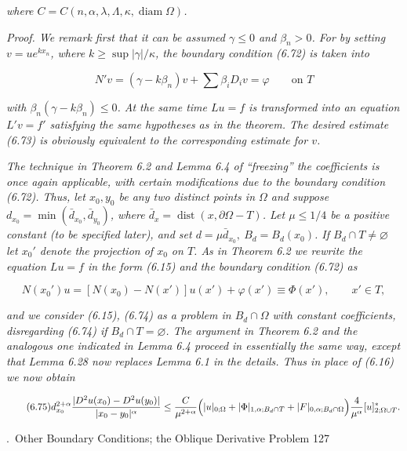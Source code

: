 \emph{where $C=C(n,\alpha,\lambda,\Lambda,\kappa,\operatorname{diam}\Omega)$.}

\emph{Proof. We remark first that it can be assumed $\gamma\le 0$ and $\beta_n>0$. For by setting
$v=ue^{kx_n}$, where $k\ge \sup|\gamma|/\kappa$, the boundary condition (6.72) is taken into}

\[
N'v=(\gamma-k\beta_n)v+\sum \beta_i D_i v=\varphi \qquad \text{on } T
\]

\emph{with $\beta_n(\gamma-k\beta_n)\le 0$. At the same time $Lu=f$ is transformed into an equation
$L'v=f'$ satisfying the same hypotheses as in the theorem. The desired estimate (6.73)
is obviously equivalent to the corresponding estimate for $v$.}

\emph{The technique in Theorem 6.2 and Lemma 6.4 of ``freezing'' the coefficients is
once again applicable, with certain modifications due to the boundary condition
(6.72). Thus, let $x_0, y_0$ be any two distinct points in $\Omega$ and suppose $d_{x_0}=\min(\bar d_{x_0}, \bar d_{y_0})$,
where $\bar d_x=\operatorname{dist}(x,\partial\Omega-T)$. Let $\mu\le 1/4$ be a positive constant (to be specified
later), and set $d=\mu \bar d_{x_0},\ B_d=B_d(x_0)$. If $B_d\cap T\ne \varnothing$ let $x_0'$ denote the projection of
$x_0$ on $T$. As in Theorem 6.2 we rewrite the equation $Lu=f$ in the form (6.15) and
the boundary condition (6.72) as}

\begin{equation}\tag{6.74}
N(x_0')u=[N(x_0)-N(x')]u(x')+\varphi(x')\equiv \Phi(x'), \qquad x'\in T,
\end{equation}

\emph{and we consider (6.15), (6.74) as a problem in $B_d\cap\Omega$ with constant coefficients,
disregarding (6.74) if $B_d\cap T=\varnothing$. The argument in Theorem 6.2 and the analogous
one indicated in Lemma 6.4 proceed in essentially the same way, except that
Lemma 6.28 now replaces Lemma 6.1 in the details. Thus in place of (6.16) we now
obtain}

\begin{equation}\tag{6.75}
d_{x_0}^{2+\alpha}\frac{|D^2u(x_0)-D^2u(y_0)|}{|x_0-y_0|^\alpha}\le \frac{C}{\mu^{2+\alpha}}
\Bigl(|u|_{0;\Omega}+|\Phi|_{1,\alpha;B_d\cap T}+|F|_{0,\alpha;B_d\cap\Omega}\Bigr)
\frac{4}{\mu^\alpha}[u]^*_{2;\Omega\cup T}.
\end{equation}


\setcounter{section}{6}
\setcounter{page}{127}
.\ Other Boundary Conditions; the Oblique Derivative Problem \hfill 127

